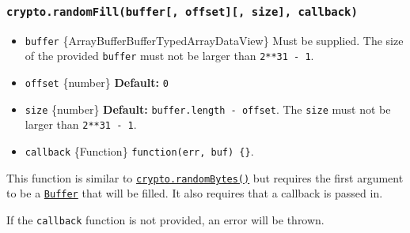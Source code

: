 \subsubsection{\texorpdfstring{\texttt{crypto.randomFill(buffer{[},\ offset{]}{[},\ size{]},\ callback)}}{crypto.randomFill(buffer{[}, offset{]}{[}, size{]}, callback)}}\label{crypto.randomfillbuffer-offset-size-callback}

\begin{itemize}
\tightlist
\item
  \texttt{buffer}
  \{ArrayBuffer\textbar Buffer\textbar TypedArray\textbar DataView\}
  Must be supplied. The size of the provided \texttt{buffer} must not be
  larger than \texttt{2**31\ -\ 1}.
\item
  \texttt{offset} \{number\} \textbf{Default:} \texttt{0}
\item
  \texttt{size} \{number\} \textbf{Default:}
  \texttt{buffer.length\ -\ offset}. The \texttt{size} must not be
  larger than \texttt{2**31\ -\ 1}.
\item
  \texttt{callback} \{Function\} \texttt{function(err,\ buf)\ \{\}}.
\end{itemize}

This function is similar to
\hyperref[cryptorandombytessize-callback]{\texttt{crypto.randomBytes()}}
but requires the first argument to be a
\href{buffer.md}{\texttt{Buffer}} that will be filled. It also requires
that a callback is passed in.

If the \texttt{callback} function is not provided, an error will be
thrown.

